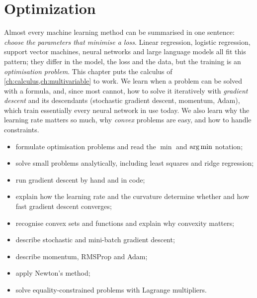 \chapter{Optimization}\label{ch:optimization}

\begin{motivation}
Almost every machine learning method can be summarised in one sentence:
\emph{choose the parameters that minimise a loss}. Linear regression, logistic
regression, support vector machines, neural networks and large language models
all fit this pattern; they differ in the model, the loss and the data, but the
training is an \emph{optimisation problem}. This chapter puts the calculus of
\cref{ch:calculus,ch:multivariable} to work. We learn when a problem can be
solved with a formula, and, since most cannot, how to solve it iteratively with
\emph{gradient descent} and its descendants (stochastic gradient descent,
momentum, Adam), which train essentially every neural network in use today.
We also learn why the learning rate matters so much, why \emph{convex}
problems are easy, and how to handle constraints.
\end{motivation}

\begin{objectives}
\begin{itemize}
  \item formulate optimisation problems and read the $\min$ and $\operatorname*{arg\,min}$
    notation;
  \item solve small problems analytically, including least squares and ridge
    regression;
  \item run gradient descent by hand and in code;
  \item explain how the learning rate and the curvature determine whether and
    how fast gradient descent converges;
  \item recognise convex sets and functions and explain why convexity matters;
  \item describe stochastic and mini-batch gradient descent;
  \item describe momentum, RMSProp and Adam;
  \item apply Newton's method;
  \item solve equality-constrained problems with Lagrange multipliers.
\end{itemize}
\end{objectives}

